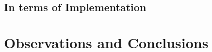 \documentclass{article}
\begin{document}
    \subsection{In terms of Implementation}    
    \clearpage
    
    
    
    
    
    \section{Observations and Conclusions}
\end{document}
